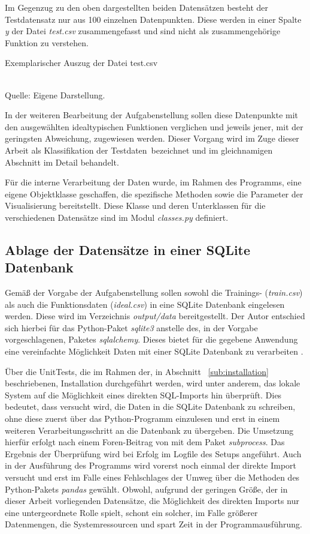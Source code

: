 Im Gegenzug zu den oben dargestellten beiden Datensätzen besteht der Testdatensatz nur aus 100 einzelnen Datenpunkten. Diese werden in einer Spalte \emph{y} der Datei \emph{test.csv} zusammengefasst und sind nicht als zusammengehörige Funktion zu verstehen. 

\begin{table}[H]
\small
\centering
\caption{Exemplarischer Auszug der Datei test.csv}
\\
Quelle: Eigene Darstellung.
\label{tab:test.csv}
\end{table} 

In der weiteren Bearbeitung der Aufgabenstellung sollen diese Datenpunkte mit den ausgewählten idealtypischen Funktionen verglichen und jeweils jener, mit der geringsten Abweichung, zugewiesen werden. Dieser Vorgang wird im Zuge dieser Arbeit als \glqq Klassifikation der Testdaten\grqq\ bezeichnet und im gleichnamigen Abschnitt im Detail behandelt.

Für die interne Verarbeitung der Daten wurde, im Rahmen des Programms, eine eigene Objektklasse geschaffen, die spezifische Methoden sowie die Parameter der Visualisierung bereitstellt. Diese Klasse und deren Unterklassen für die verschiedenen Datensätze sind im Modul \emph{classes.py} definiert.

\subsection{Ablage der Datensätze in einer SQLite Datenbank}

Gemäß der Vorgabe der Aufgabenstellung sollen sowohl die Trainings- (\emph{train.csv}) als auch die Funktionsdaten (\emph{ideal.csv}) in eine SQLite Datenbank eingelesen werden. Diese wird im Verzeichnis \emph{output/data} bereitgestellt. Der Autor entschied sich hierbei für das Python-Paket \emph{sqlite3} anstelle des, in der Vorgabe vorgeschlagenen, Paketes \emph{sqlalchemy}. Dieses bietet für die gegebene Anwendung eine vereinfachte Möglichkeit Daten mit einer SQLite Datenbank zu verarbeiten \citep{gosset_accessing_2017}.

Über die UnitTests, die im Rahmen der, in Abschnitt ~\ref{sub:installation} beschriebenen, Installation durchgeführt werden, wird unter anderem, das lokale System auf die Möglichkeit eines direkten SQL-Imports hin überprüft. Dies bedeutet, dass versucht wird, die Daten in die SQLite Datenbank zu schreiben, ohne diese zuerst über das Python-Programm einzulesen und erst in einem weiteren Verarbeitungsschritt an die Datenbank zu übergeben. Die Umsetzung hierfür erfolgt nach einem Foren-Beitrag von \cite{stevens-haas_importing_2021} mit dem Paket \emph{subprocess}. Das Ergebnis der Überprüfung wird bei Erfolg im Logfile des Setups angeführt. Auch in der Ausführung des Programms wird vorerst noch einmal der direkte Import versucht und erst im Falle eines Fehlschlages der Umweg über die Methoden des Python-Pakets \emph{pandas} gewählt. Obwohl, aufgrund der geringen Größe, der in dieser Arbeit vorliegenden Datensätze, die Möglichkeit des direkten Imports nur eine untergeordnete Rolle spielt, schont ein solcher, im Falle größerer Datenmengen, die Systemressourcen und spart Zeit in der Programmausführung.

